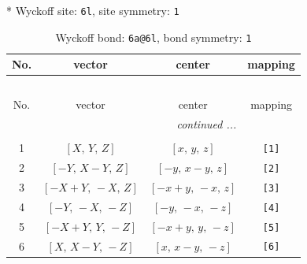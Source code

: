 \documentclass[fleqn,8pt]{jsarticle}
\begin{document}
* Wyckoff site: {\tt 6l}, site symmetry: {\tt 1}
\renewcommand{\arraystretch}{1.2}
\begin{longtable}{cccc}
\caption{Wyckoff bond: {\tt 6a@6l}, bond symmetry: {\tt 1}}
 \\
 \hline \hline
No. & vector & center & mapping \\ \hline \endfirsthead

\multicolumn{3}{l}{\tablename\ \thetable{}} \\
 \hline \hline
No. & vector & center & mapping \\ \hline \endhead

 \hline \hline
\multicolumn{3}{r}{\footnotesize\it continued ...} \\ \endfoot

 \hline \hline
\multicolumn{3}{r}{} \\ \endlastfoot

1 & $\left[ X,\, Y,\, Z \right]$ & $\left[ x,\, y,\, z \right]$ & {\tt [1]} \\ \hline
2 & $\left[ - Y,\, X - Y,\, Z \right]$ & $\left[ - y,\, x - y,\, z \right]$ & {\tt [2]} \\ \hline
3 & $\left[ - X + Y,\, - X,\, Z \right]$ & $\left[ - x + y,\, - x,\, z \right]$ & {\tt [3]} \\ \hline
4 & $\left[ - Y,\, - X,\, - Z \right]$ & $\left[ - y,\, - x,\, - z \right]$ & {\tt [4]} \\ \hline
5 & $\left[ - X + Y,\, Y,\, - Z \right]$ & $\left[ - x + y,\, y,\, - z \right]$ & {\tt [5]} \\ \hline
6 & $\left[ X,\, X - Y,\, - Z \right]$ & $\left[ x,\, x - y,\, - z \right]$ & {\tt [6]} \\
\end{longtable}
\end{document}
